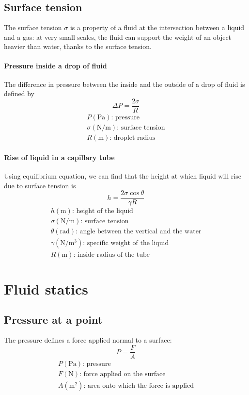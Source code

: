 \documentclass[10pt, twocolumn]{article}
\begin{document}
\subsection{Surface tension}
The surface tension \(\sigma\) is a property of a fluid at the intersection between a liquid and a gas: at very small scales, the fluid can support the weight of an object heavier than water, thanks to the surface tension.

\paragraph{Pressure inside a drop of fluid}
The difference in pressure between the inside and the outside of a drop of fluid is defined by
\[
  \Delta P = \frac{2\sigma}{R}
\]
\[
  \begin{array}{|l}
    P (\si{\pascal}) \text{: pressure}                       \\
    \sigma (\si{\newton\per\metre}) \text{: surface tension} \\
    R (\si{\metre}) \text{: droplet radius}
  \end{array}
\]

\paragraph{Rise of liquid in a capillary tube}
Using equilibrium equation, we can find that the height at which liquid will rise due to surface tension is
\[
  h = \frac{2 \sigma \cos\theta}{\gamma R}
\]
\[
  \begin{array}{|l}
    h (\si{\metre}) \text{: height of the liquid}                                \\
    \sigma (\si{\newton\per\metre}) \text{: surface tension}                     \\
    \theta (\si{\radian}) \text{: angle between the vertical and the water}      \\
    \gamma (\si{\newton\per\metre\cubed}) \text{: specific weight of the liquid} \\
    R (\si{\metre}) \text{: inside radius of the tube}
  \end{array}
\]

\section{Fluid statics}
\subsection{Pressure at a point}
The pressure defines a force applied normal to a surface:
\[
  P = \frac{F}{A}
\]
\[
  \begin{array}{|l}
    P (\si{\pascal}) \text{: pressure}                     \\
    F (\si{\newton}) \text{: force applied on the surface} \\
    A (\si{\metre\squared}) \text{: area onto which the force is applied}
  \end{array}
\]
\end{document}
